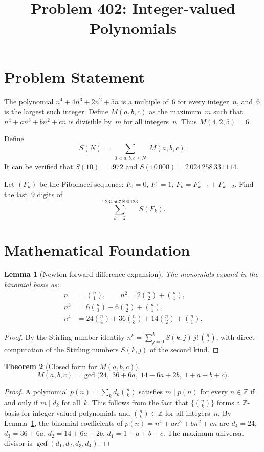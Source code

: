\documentclass[11pt]{article}
\title{Problem 402: Integer-valued Polynomials}
\author{}
\date{}
\newtheorem{theorem}{Theorem}
\newtheorem{lemma}[theorem]{Lemma}
\begin{document}
\maketitle

\section{Problem Statement}

The polynomial $n^4 + 4n^3 + 2n^2 + 5n$ is a multiple of~$6$ for every integer~$n$, and~$6$ is the largest such integer.  Define $M(a,b,c)$ as the maximum~$m$ such that $n^4 + an^3 + bn^2 + cn$ is divisible by~$m$ for all integers~$n$.  Thus $M(4,2,5) = 6$.

Define
\[
S(N) = \sum_{\substack{0 < a,b,c \le N}} M(a,b,c).
\]
It can be verified that $S(10) = 1972$ and $S(10\,000) = 2\,024\,258\,331\,114$.

Let $(F_k)$ be the Fibonacci sequence: $F_0 = 0$, $F_1 = 1$, $F_k = F_{k-1} + F_{k-2}$.  Find the last~9 digits of
\[
\sum_{k=2}^{1\,234\,567\,890\,123} S(F_k).
\]

\section{Mathematical Foundation}

\begin{lemma}[Newton forward-difference expansion]
\label{lem:binomial}
The monomials expand in the binomial basis as:
\begin{align*}
n &= \binom{n}{1}, \qquad
n^2 = 2\binom{n}{2} + \binom{n}{1}, \\
n^3 &= 6\binom{n}{3} + 6\binom{n}{2} + \binom{n}{1}, \\
n^4 &= 24\binom{n}{4} + 36\binom{n}{3} + 14\binom{n}{2} + \binom{n}{1}.
\end{align*}
\end{lemma}

\begin{proof}
By the Stirling number identity $n^k = \sum_{j=0}^{k} S(k,j)\,j!\,\binom{n}{j}$, with direct computation of the Stirling numbers $S(k,j)$ of the second kind.
\end{proof}

\begin{theorem}[Closed form for $M(a,b,c)$]
\label{thm:M}
\[
M(a,b,c) = \gcd\!\big(24,\; 36+6a,\; 14+6a+2b,\; 1+a+b+c\big).
\]
\end{theorem}

\begin{proof}
A polynomial $p(n) = \sum_{k} d_k \binom{n}{k}$ satisfies $m \mid p(n)$ for every $n \in \mathbb{Z}$ if and only if $m \mid d_k$ for all~$k$.  This follows from the fact that $\{\binom{n}{k}\}$ forms a $\mathbb{Z}$-basis for integer-valued polynomials and $\binom{n}{k} \in \mathbb{Z}$ for all integers~$n$.  By Lemma~\ref{lem:binomial}, the binomial coefficients of $p(n) = n^4 + an^3 + bn^2 + cn$ are $d_4 = 24$, $d_3 = 36+6a$, $d_2 = 14+6a+2b$, $d_1 = 1+a+b+c$.  The maximum universal divisor is $\gcd(d_1, d_2, d_3, d_4)$.
\end{proof}
\end{document}
